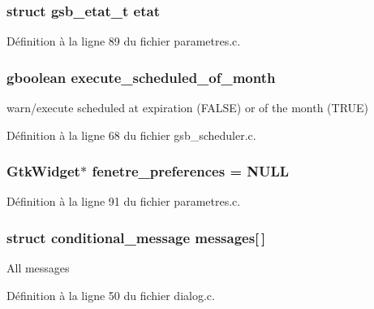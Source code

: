 \subsubsection[{etat}]{\setlength{\rightskip}{0pt plus 5cm}struct {\bf gsb\_\-etat\_\-t} {\bf etat}}\label{parametres_8c_ab2a744f5d2124688473d13979420e911}


Définition à la ligne 89 du fichier parametres.c.

\subsubsection[{execute\_\-scheduled\_\-of\_\-month}]{\setlength{\rightskip}{0pt plus 5cm}gboolean {\bf execute\_\-scheduled\_\-of\_\-month}}\label{parametres_8c_a28dbce464ef05c5a6db0d64a31fff16d}
warn/execute scheduled at expiration (FALSE) or of the month (TRUE) 

Définition à la ligne 68 du fichier gsb\_\-scheduler.c.

\subsubsection[{fenetre\_\-preferences}]{\setlength{\rightskip}{0pt plus 5cm}GtkWidget$\ast$ {\bf fenetre\_\-preferences} = NULL}\label{parametres_8c_a280b98575c3c9e0b637ec78b157a1ff4}


Définition à la ligne 91 du fichier parametres.c.

\subsubsection[{messages}]{\setlength{\rightskip}{0pt plus 5cm}struct {\bf conditional\_\-message} {\bf messages}[$\,$]}\label{parametres_8c_a430b9f94c0af809780196ca7d7040fde}
All messages 

Définition à la ligne 50 du fichier dialog.c.

